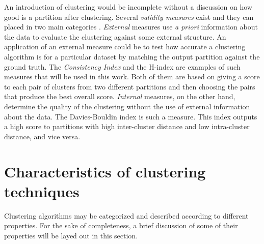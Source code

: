 An introduction of clustering would be incomplete without a discussion on how good is a partition after clustering.
Several \emph{validity measures} exist and they can placed in two main categories \cite{Aggarwal2014}.
\emph{External} measures use \emph{a priori} information about the data to evaluate the clustering against some external structure.
An application of an external measure could be to test how accurate a clustering algorithm is for a particular dataset by matching the output partition against the ground truth.
The \emph{Consistency Index} \cite{Fred2001} and the H-index \cite{Meila2003} are examples of such measures that will be used in this work. %
Both of them are based on giving a score to each pair of clusters from two different partitions and then choosing the pairs that produce the best overall score.
\emph{Internal} measures, on the other hand, determine the quality of the clustering without the use of external information about the data.
The Davies-Bouldin index \cite{davies1979cluster} is such a measure.
This index outputs a high score to partitions with high inter-cluster distance and low intra-cluster distance, and vice versa.




\section{Characteristics of clustering techniques}
\label{sec:clustering properties}

Clustering algorithms may be categorized and described according to different properties.
For the sake of completeness, a brief discussion of some of their properties will be layed out in this section.

